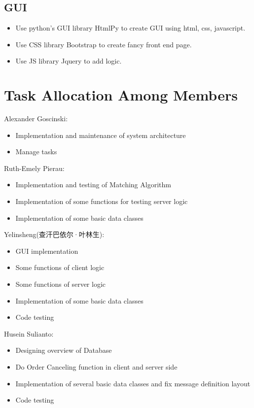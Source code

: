 \documentclass[a4paper, 11pt]{article}
\begin{document}
\subsection*{GUI}

\begin{itemize}
  \item Use python's GUI library HtmlPy to create GUI using html, css, javascript.
  \item Use CSS library Bootstrap to create fancy front end page. 
  \item Use JS library Jquery to add logic.
\end{itemize}




\section*{Task Allocation Among Members}
Alexander Goscinski:
\begin{itemize}
  \item Implementation and maintenance of system architecture
  \item Manage tasks
\end{itemize}

Ruth-Emely Pierau:
\begin{itemize}
	\item Implementation and testing of Matching Algorithm
	\item Implementation of some functions for testing server logic
	\item Implementation of some basic data classes
\end{itemize}

Yelinsheng(查汗巴依尔·叶林生):

\begin{itemize}
  \item GUI implementation
  \item Some functions of client logic
  \item Some functions of server logic
  \item Implementation of some basic data classes
  \item Code testing
\end{itemize}

Husein Sulianto:
\begin{itemize}
  \item Designing overview of Database
  \item Do Order Canceling function in client and server side
  \item Implementation of several basic data classes and fix message definition layout
  \item Code testing
\end{itemize}
\end{document}

